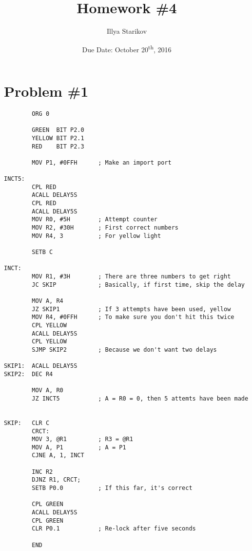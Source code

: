 \documentclass[12pt]{article}
\title{Homework \#4}
\date{Due Date: October 20\textsuperscript{th}, 2016}
\author{Illya Starikov}
\begin{document}
\maketitle

\section{Problem \#1}
\begin{verbatim}
        ORG 0

        GREEN  BIT P2.0
        YELLOW BIT P2.1
        RED    BIT P2.3

        MOV P1, #0FFH      ; Make an import port

INCT5:
        CPL RED
        ACALL DELAY5S
        CPL RED
        ACALL DELAY5S
        MOV R0, #5H        ; Attempt counter
        MOV R2, #30H       ; First correct numbers
        MOV R4, 3          ; For yellow light

        SETB C

INCT:
        MOV R1, #3H        ; There are three numbers to get right
        JC SKIP            ; Basically, if first time, skip the delay

        MOV A, R4
        JZ SKIP1           ; If 3 attempts have been used, yellow
        MOV R4, #0FFH      ; To make sure you don't hit this twice
        CPL YELLOW
        ACALL DELAY5S
        CPL YELLOW
        SJMP SKIP2         ; Because we don't want two delays

SKIP1:  ACALL DELAY5S
SKIP2:  DEC R4

        MOV A, R0
        JZ INCT5           ; A = R0 = 0, then 5 attemts have been made


SKIP:   CLR C
        CRCT:
        MOV 3, @R1         ; R3 = @R1
        MOV A, P1          ; A = P1
        CJNE A, 1, INCT

        INC R2
        DJNZ R1, CRCT;
        SETB P0.0          ; If this far, it's correct

        CPL GREEN
        ACALL DELAY5S
        CPL GREEN
        CLR P0.1           ; Re-lock after five seconds

        END


\end{verbatim}
\end{document}
